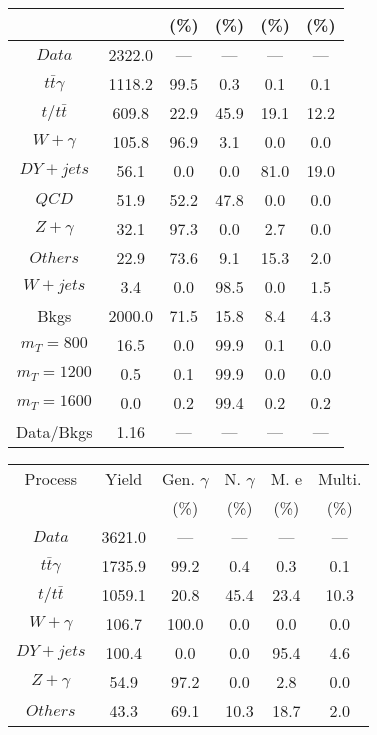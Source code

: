 \begin{figure}
\begin{minipage}[c]{0.32\textwidth}
{\begin{tabular}{cccccc}
 &  & (\%) & (\%) & (\%) & (\%)  \\
\hline
                                                                      $ Data $ &  2322.0 &  --- &  --- &  --- &  ---\\
$ t\bar{t}\gamma $ &  1118.2 &  99.5 &  0.3 &  0.1 &  0.1\\
$ t/t\bar{t} $ &  609.8 &  22.9 &  45.9 &  19.1 &  12.2\\
$ W+\gamma $ &  105.8 &  96.9 &  3.1 &  0.0 &  0.0\\
$ DY+jets $ &  56.1 &  0.0 &  0.0 &  81.0 &  19.0\\
$ QCD $ &  51.9 &  52.2 &  47.8 &  0.0 &  0.0\\
$ Z+\gamma $ &  32.1 &  97.3 &  0.0 &  2.7 &  0.0\\
$ Others $ &  22.9 &  73.6 &  9.1 &  15.3 &  2.0\\
$ W+jets $ &  3.4 &  0.0 &  98.5 &  0.0 &  1.5\\
Bkgs &  2000.0 &  71.5 &  15.8 &  8.4 &  4.3\\
$ m_{T} = 800 $ &  16.5 &  0.0 &  99.9 &  0.1 &  0.0\\
$ m_{T} = 1200 $ &  0.5 &  0.1 &  99.9 &  0.0 &  0.0\\
$ m_{T} = 1600 $ &  0.0 &  0.2 &  99.4 &  0.2 &  0.2\\
Data/Bkgs &  1.16 &  --- &  --- &  --- &  ---\\
\hline
\end{tabular}
}
\end{minipage}
\begin{minipage}[c]{0.32\textwidth}
\centering
\tiny{
\begin{tabular}{cccccc}
\hline
Process & Yield & Gen. $\gamma$ & N. $\gamma$ & M. e & Multi. \\
 &  & (\%) & (\%) & (\%) & (\%)  \\
\hline
                                                                      $ Data $ &  3621.0 &  --- &  --- &  --- &  ---\\
$ t\bar{t}\gamma $ &  1735.9 &  99.2 &  0.4 &  0.3 &  0.1\\
$ t/t\bar{t} $ &  1059.1 &  20.8 &  45.4 &  23.4 &  10.3\\
$ W+\gamma $ &  106.7 &  100.0 &  0.0 &  0.0 &  0.0\\
$ DY+jets $ &  100.4 &  0.0 &  0.0 &  95.4 &  4.6\\
$ Z+\gamma $ &  54.9 &  97.2 &  0.0 &  2.8 &  0.0\\
$ Others $ &  43.3 &  69.1 &  10.3 &  18.7 &  2.0\\

\end{tabular}}
\end{minipage}
\end{figure}
